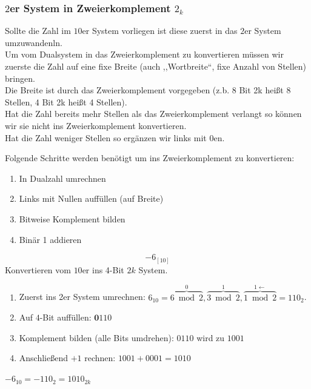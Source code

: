 \documentclass{article}
\begin{document}
\subsubsection{$2$er System in Zweierkomplement $2_k$}

Sollte die Zahl im $10$er System vorliegen ist diese zuerst in das $2$er System umzuwandenln. \\

Um vom Dualsystem in das Zweierkomplement zu konvertieren müssen wir zuerste die Zahl auf eine fixe Breite (auch ,,Wortbreite``, fixe Anzahl von Stellen) bringen. \\
Die Breite ist durch das Zweierkomplement vorgegeben (z.b. 8 Bit 2k heißt 8 Stellen, 4 Bit 2k heißt 4 Stellen). \\
Hat die Zahl bereits mehr Stellen als das Zweierkomplement verlangt so können wir sie nicht ins Zweierkomplement konvertieren. \\
Hat die Zahl weniger Stellen so ergänzen wir links mit $0$en.

Folgende Schritte werden benötigt um ins Zweierkomplement zu konvertieren:

\begin{enumerate}[(1)]
    \item In Dualzahl umrechnen
    \item Links mit Nullen auffüllen (auf Breite)
    \item Bitweise Komplement bilden
    \item Binär 1 addieren
\end{enumerate}



\begin{question}[Konvertieren in $2_k$]
    \begin{equation*}
        -6_{[10]}
    \end{equation*}
    Konvertieren vom $10$er ins 4-Bit $2k$ System.
\end{question}

\begin{answer}[]
    \begin{enumerate}[(1)]
        \item Zuerst ins 2er System umrechnen: $6_{10}=\overset{0}{\overbrace{6\bmod2}},\overset{1}{\overbrace{3\bmod2}},\overset{1\leftarrow}{\overbrace{1\bmod2}}=110_{2}$.
        \item Auf $4$-Bit auffüllen: $\textbf{0}110$
        \item Komplement bilden (alle Bits umdrehen): $0110$ wird zu $1001$
        \item Anschließend $+1$ rechnen: $1001 + 0001 = 1010$
    \end{enumerate}
    $ -6_{10} = -110_{2} =  1010_{2k}$
\end{answer}
\end{document}
